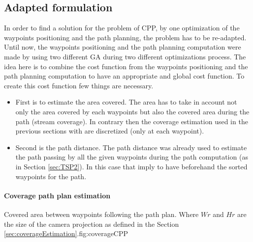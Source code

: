 		\subsection{Adapted formulation }
In order to find a solution for the problem of CPP, by one optimization of the waypoints positioning and the path planning, the problem has to be re-adapted.
Until now, the waypoints positioning and the path planning computation were made by using two different GA during two different optimizations process. The idea here is to combine the cost function from the waypoints positioning and the path planning computation to have an appropriate and global cost function.
To create this cost function few things are necessary.
\begin{itemize}
	\item First is to estimate the area covered. The area has to take in account not only the area covered by each waypoints but also the covered area during the path (stream coverage). In contrary then the coverage estimation used in the previous sections with are discretized (only at each waypoint). %
	\item Second is the path distance. The path distance was already used to estimate the path passing  by all the given waypoints during the path computation (as in Section \ref{sec:TSP2}). In this case that imply to have beforehand the sorted waypoints for the path.
\end{itemize}

\paragraph*{Coverage path plan estimation}\label{par:CPPestimation}

  \begin{mfigures}[!]{Covered area between waypoints following the path plan. Where $Wr$ and $Hr$ are the size of the camera projection  as defined in the Section \ref{sec:coverageEstimation}.}{fig:coverageCPP} \centering

\end{mfigures}  



